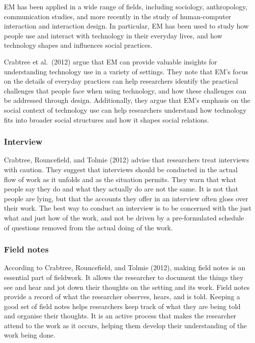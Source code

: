 \documentclass[
]{book}
\begin{document}
EM has been applied in a wide range of fields, including sociology, anthropology, communication studies, and more recently in the study of human-computer interaction and interaction design. In particular, EM has been used to study how people use and interact with technology in their everyday lives, and how technology shapes and influences social practices.

Crabtree et al.~(2012) argue that EM can provide valuable insights for understanding technology use in a variety of settings. They note that EM's focus on the details of everyday practices can help researchers identify the practical challenges that people face when using technology, and how these challenges can be addressed through design. Additionally, they argue that EM's emphasis on the social context of technology use can help researchers understand how technology fits into broader social structures and how it shapes social relations.

\hypertarget{interview}{%
\subsubsection{Interview}\label{interview}}

Crabtree, Rouncefield, and Tolmie (2012) advise that researchers treat interviews with caution. They suggest that interviews should be conducted in the actual flow of work as it unfolds and as the situation permits. They warn that what people say they do and what they actually do are not the same. It is not that people are lying, but that the accounts they offer in an interview often gloss over their work. The best way to conduct an interview is to be concerned with the just what and just how of the work, and not be driven by a pre-formulated schedule of questions removed from the actual doing of the work.

\hypertarget{field-notes}{%
\subsubsection{Field notes}\label{field-notes}}

According to Crabtree, Rouncefield, and Tolmie (2012), making field notes is an essential part of fieldwork. It allows the researcher to document the things they see and hear and jot down their thoughts on the setting and its work. Field notes provide a record of what the researcher observes, hears, and is told. Keeping a good set of field notes helps researchers keep track of what they are being told and organise their thoughts. It is an active process that makes the researcher attend to the work as it occurs, helping them develop their understanding of the work being done.
\end{document}
